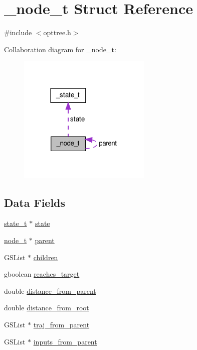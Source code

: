 \hypertarget{a00003}{\section{\-\_\-node\-\_\-t \-Struct \-Reference}
\label{d1/d7c/a00003}
}


{\ttfamily \#include $<$opttree.\-h$>$}



\-Collaboration diagram for \-\_\-node\-\_\-t\-:\nopagebreak
\begin{figure}[H]
\begin{center}
\leavevmode
\includegraphics[width=180pt]{d4/d8c/a00035}
\end{center}
\end{figure}
\subsection*{\-Data \-Fields}
\begin{DoxyCompactItemize}
\item 
\hyperlink{a00018_a1c9d0bb39483d4981491e6383b0dbb47_a1c9d0bb39483d4981491e6383b0dbb47}{state\-\_\-t} $\ast$ \hyperlink{a00003_ad180be797ec209ed2712c000b4fd536f_ad180be797ec209ed2712c000b4fd536f}{state}
\item 
\hyperlink{a00020_a9c3f304c1ae0687240efd69b7dc98cd6_a9c3f304c1ae0687240efd69b7dc98cd6}{node\-\_\-t} $\ast$ \hyperlink{a00003_a3d511232fc93632bb149b5932f215a4f_a3d511232fc93632bb149b5932f215a4f}{parent}
\item 
\-G\-S\-List $\ast$ \hyperlink{a00003_a079f3e21ccc72b5e64c1e75be0a9d527_a079f3e21ccc72b5e64c1e75be0a9d527}{children}
\item 
gboolean \hyperlink{a00003_a777bee52ae854bd4b84bddfc8ab97ede_a777bee52ae854bd4b84bddfc8ab97ede}{reaches\-\_\-target}
\item 
double \hyperlink{a00003_a43d03ac887471ca47aaa3e1a99737821_a43d03ac887471ca47aaa3e1a99737821}{distance\-\_\-from\-\_\-parent}
\item 
double \hyperlink{a00003_a8a0362089c7c238279211ee1d3d18f64_a8a0362089c7c238279211ee1d3d18f64}{distance\-\_\-from\-\_\-root}
\item 
\-G\-S\-List $\ast$ \hyperlink{a00003_a5e2ba085667b237c00e4c754c829e9e9_a5e2ba085667b237c00e4c754c829e9e9}{traj\-\_\-from\-\_\-parent}
\item 
\-G\-S\-List $\ast$ \hyperlink{a00003_a3105712d067868a810af6719f032306d_a3105712d067868a810af6719f032306d}{inputs\-\_\-from\-\_\-parent}
\end{DoxyCompactItemize}


